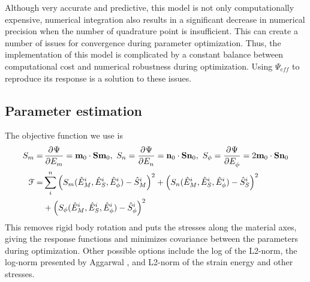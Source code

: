 	Although very accurate and predictive, this model is not only computationally expensive, numerical integration also results in a significant decrease in numerical precision when the number of quadrature point is insufficient. This can create a number of issues for convergence during parameter optimization. Thus, the implementation of this model is complicated by a constant balance between computational cost and numerical robustness during optimization. Using $\Psi_{eff}$ to reproduce its response is a solution to these issues. %
    
    
    



	









\subsection{Parameter estimation}

	The objective function we use is 
\begin{equation}\label{eqn:objectivefunction}
\begin{aligned}
S_m =& \dpd{\Psi}{E_m} = \mathbf{m}_0\cdot\mathbf{S}\mathbf{m}_0,
	\  S_n = \dpd{\Psi}{E_n} = \mathbf{n}_0\cdot\mathbf{S}\mathbf{n}_0, 
    \  S_\phi = \dpd{\Psi}{E_\phi} = 2\mathbf{m}_0\cdot\mathbf{S}\mathbf{n}_0 \\
\mathcal{F} =& \sum_i^n \left(S_m(\hat{E}_M^i, \hat{E}_S^i, \hat{E}_\phi^i) - \hat{S}_M^i \right)^2 + \left(S_n(\hat{E}_M^i, \hat{E}_S^i, \hat{E}_\phi^i) - \hat{S}_S^i \right)^2     \\
    &+ \left(S_\phi(\hat{E}_M^i, \hat{E}_S^i, \hat{E}_\phi^i) - \hat{S}_\phi^i \right)^2
\end{aligned}
\end{equation}
    This removes rigid body rotation and puts the stresses along the material axes, giving the response functions and minimizes covariance between the parameters during optimization. Other possible options include the log of the L2-norm, the log-norm presented by Aggarwal \cite{aggarwal_improved_2017}, and L2-norm of the strain energy and other stresses.


